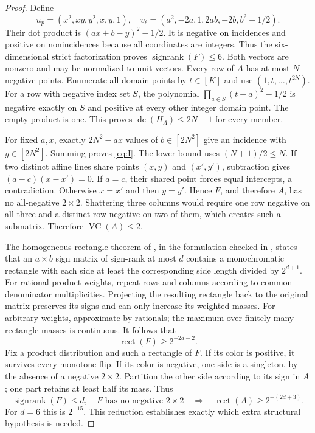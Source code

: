 \documentclass[11pt]{article}
\DeclareMathOperator{\dc}{dc}
\DeclareMathOperator{\sr}{signrank}
\DeclareMathOperator{\rect}{rect}
\newcommand{\1}{\mathbf 1}
\begin{document}
\begin{proof}
Define
\[
 u_p=(x^2,xy,y^2,x,y,1),\quad
 v_\ell=(a^2,-2a,1,2ab,-2b,b^2-1/2).
\]
Their dot product is $(ax+b-y)^2-1/2$. It is negative on incidences and positive on nonincidences because all coordinates are integers. Thus the six-dimensional strict factorization proves $\sr(F)\le6$. Both vectors are nonzero and may be normalized to unit vectors. Every row of $A$ has at most $N$ negative points. Enumerate all domain points by $t\in[K]$ and use $(1,t,\ldots,t^{2N})$. For a row with negative index set $S$, the polynomial $\prod_{a\in S}(t-a)^2-1/2$ is negative exactly on $S$ and positive at every other integer domain point. The empty product is one. This proves $\dc(H_A)\le2N+1$ for every member.

For fixed $a,x$, exactly $2N^2-ax$ values of $b\in[2N^2]$ give an incidence with $y\in[2N^2]$. Summing proves \eqref{eq:I}. The lower bound uses $(N+1)/2\le N$. If two distinct affine lines share points $(x,y)$ and $(x',y')$, subtraction gives $(a-c)(x-x')=0$. If $a=c$, their shared point forces equal intercepts, a contradiction. Otherwise $x=x'$ and then $y=y'$. Hence $F$, and therefore $A$, has no all-negative $2\times2$. Shattering three columns would require one row negative on all three and a distinct row negative on two of them, which creates such a submatrix. Therefore $\operatorname{VC}(A)\le2$.

The homogeneous-rectangle theorem of \citet[Theorem 1.3]{APP05}, in the formulation checked in \citet[Theorem 1.9]{HHPTZ22}, states that an $a\times b$ sign matrix of sign-rank at most $d$ contains a monochromatic rectangle with each side at least the corresponding side length divided by $2^{d+1}$. For rational product weights, repeat rows and columns according to common-denominator multiplicities. Projecting the resulting rectangle back to the original matrix preserves its signs and can only increase its weighted masses. For arbitrary weights, approximate by rationals; the maximum over finitely many rectangle masses is continuous. It follows that
\begin{equation}\label{eq:sharp-rect}
 \rect(F)\ge2^{-2d-2}.
\end{equation}
Fix a product distribution and such a rectangle of $F$. If its color is positive, it survives every monotone flip. If its color is negative, one side is a singleton, by the absence of a negative $2\times2$. Partition the other side according to its sign in $A$; one part retains at least half its mass. Thus
\begin{equation}\label{eq:structural}
 \sr(F)\le d,\quad F\text{ has no negative }2\times2
 \quad\Longrightarrow\quad \rect(A)\ge2^{-(2d+3)}.
\end{equation}
For $d=6$ this is $2^{-15}$. This reduction establishes exactly which extra structural hypothesis is needed.


\end{proof}
\end{document}
